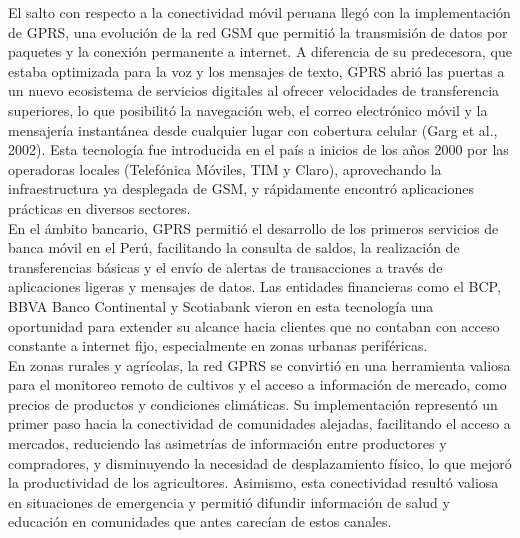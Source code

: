 \documentclass[12pt,a4paper]{article}
\begin{document}
	 El salto con respecto a la conectividad móvil peruana llegó con la implementación de GPRS, una evolución de la red GSM que permitió la transmisión de datos por paquetes y la conexión permanente a internet. A diferencia de su predecesora, que estaba optimizada para la voz y los mensajes de texto, GPRS abrió las puertas a un nuevo ecosistema de servicios digitales al ofrecer velocidades de transferencia superiores, lo que posibilitó la navegación web, el correo electrónico móvil y la mensajería instantánea desde cualquier lugar con cobertura celular (Garg et al., 2002). Esta tecnología fue introducida en el país a inicios de los años 2000 por las operadoras locales (Telefónica Móviles, TIM y Claro), aprovechando la infraestructura ya desplegada de GSM, y rápidamente encontró aplicaciones prácticas en diversos sectores. \\
	 
	 En el ámbito bancario, GPRS permitió el desarrollo de los primeros servicios de banca móvil en el Perú, facilitando la consulta de saldos, la realización de transferencias básicas y el envío de alertas de transacciones a través de aplicaciones ligeras y mensajes de datos. Las entidades financieras como el BCP, BBVA Banco Continental y Scotiabank vieron en esta tecnología una oportunidad para extender su alcance hacia clientes que no contaban con acceso constante a internet fijo, especialmente en zonas urbanas periféricas. \\
	 
	 En zonas rurales y agrícolas, la red GPRS se convirtió en una herramienta valiosa para el monitoreo remoto de cultivos y el acceso a información de mercado, como precios de productos y condiciones climáticas. Su implementación representó un primer paso hacia la conectividad de comunidades alejadas, facilitando el acceso a mercados, reduciendo las asimetrías de información entre productores y compradores, y disminuyendo la necesidad de desplazamiento físico, lo que mejoró la productividad de los agricultores. Asimismo, esta conectividad resultó valiosa en situaciones de emergencia y permitió difundir información de salud y educación en comunidades que antes carecían de estos canales. \\
	 
\end{document}
